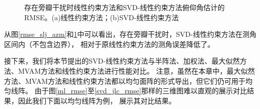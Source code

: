 \documentclass[master]{thesis-uestc}
\begin{document}
\begin{figure}[H]
    \caption{存在旁瓣干扰时线性约束方法和SVD-线性约束方法俯仰角估计的RMSE。(a)线性约束方法；(b)SVD-线性约束方法}
    \label{rmse_slj_elv}
\end{figure}

从图\ref{rmse_slj_azm}和\ref{rmse_slj_elv}中可以看出，存在旁瓣干扰时，SVD-线性约束方法在测角区间内（不包含边界），
相对于原线性约束方法的测角误差降低了。

接下来，我们将本节提出的SVD-线性约束方法与半阵法、加权法、最大似然方法、MVAM方法和线性约束方法进行性能对比。
注意，虽然在本章中，最大似然方法、MVAM方法和线性约束方法都以均匀面阵的形式导出，但它们仍可用于均匀线阵。
由于图\ref{ml_rmse}至\ref{svd_jlc_rmse}那样的三维图难以直观的展示对比结果，因此我们下面以均匀线阵为例，
展示其对比结果。
\end{document}
